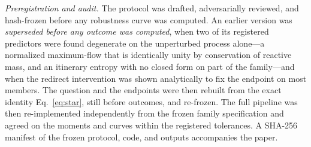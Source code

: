 \documentclass[aps,pre,twocolumn,superscriptaddress,floatfix,longbibliography]{revtex4-2}
\begin{document}
\begin{table}[t]
\caption{Per-member outcome by resolution. $\circ$ mean sufficient;
$\bullet$ mean+variance closes to $\tau=10^{-2}$; $\triangledown$ second order
improves but does not close; $\blacktriangle$ higher-order. $m_j$ is the number of
resolutions at which the mean fails.}
\label{tab:map}

\end{table}

\emph{Preregistration and audit.} The protocol was drafted, adversarially reviewed,
and hash-frozen before any robustness curve was computed. An earlier version was
\emph{superseded before any outcome was computed}, when two of its registered
predictors were found degenerate on the unperturbed process alone---a normalized
maximum-flow that is identically unity by conservation of reactive mass, and an
itinerary entropy with no closed form on part of the family---and when the redirect
intervention was shown analytically to fix the endpoint on most members. The
question and the endpoints were then rebuilt from the exact identity
Eq.~\eqref{eq:star}, still before outcomes, and re-frozen. The full pipeline was
then re-implemented independently from the frozen family specification and agreed on
the moments and curves within the registered tolerances. A SHA-256 manifest of the
frozen protocol, code, and outputs accompanies the paper.
\end{document}
